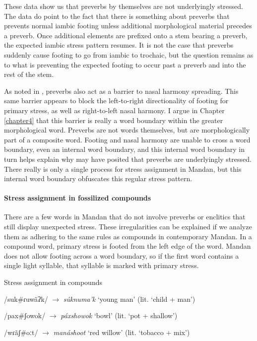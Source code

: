 These data show us that preverbs by themselves are not underlyingly stressed. The data do point to the fact that there is something about preverbs that prevents normal iambic footing unless additional morphological material precedes a preverb. Once additional elements are prefixed onto a stem bearing a preverb, the expected iambic stress pattern resumes. It is not the case that preverbs suddenly cause footing to go from iambic to trochaic, but the question remains as to what is preventing the expected footing to occur past a preverb and into the rest of the stem.

As noted in , preverbs also act as a barrier to nasal harmony spreading. This same barrier appears to block the left-to-right directionality of footing for primary stress, as well as right-to-left nasal harmony. I argue in Chapter \ref{chapter4} that this barrier is really a word boundary within the greater morphological word. Preverbs are not words themselves, but are morphologically part of a composite word. Footing and nasal harmony are unable to cross a word boundary, even an internal word boundary, and this internal word boundary in turn helps explain why \citet{hollow1970} may have posited that preverbs are underlyingly stressed. There really is only a single process for stress assignment in Mandan, but this internal word boundary obfuscates this regular stress pattern.

\paragraph{Stress assignment in fossilized compounds}

There are a few words in Mandan that do not involve preverbs or enclitics that still display unexpected stress. These irregularities can be explained if we analyze them as adhering to the same rules as compounds in contemporary Mandan. In a compound word, primary stress is footed from the left edge of the word. Mandan does not allow footing across a word boundary, so if the first word contains a single light syllable, that syllable is marked with primary stress.

\begin{exe}
\item\label{normalcompounds} Stress assignment in compounds

	\begin{xlist}
	\item /suk\#ɾuwãʔk/ $\to$ \textit{súknuma'k} `young man' (lit. `child + man')

	\item /pax\#ʃowok/ $\to$ \textit{páxshowok} `bowl' (lit. `pot + shallow')

	\item /wɾãʃ\#oːt/ $\to$ \textit{manáshoot} `red willow' (lit. `tobacco + mix')

	\end{xlist}

\end{exe}


